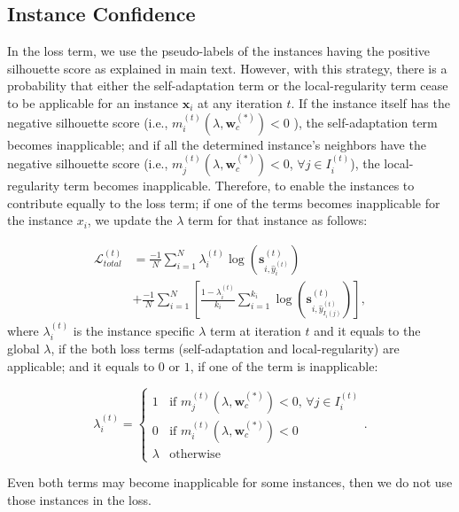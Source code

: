 \documentclass[12pt]{iopart}
\newcommand{\matr}[1]{\mathbf{#1}}
\begin{document}
\subsection{Instance Confidence}
In the loss term, we use the pseudo-labels of the instances having the positive silhouette score as explained in main text. However, with this strategy, there is a probability that either the self-adaptation term or the local-regularity term cease to be applicable for an instance $\matr{x}_i$ at any iteration $t$. If the instance itself has the negative silhouette score (i.e., $m_i^{(t)}(\lambda,\matr{w}_c^{(*)}) < 0$  ), the self-adaptation term becomes inapplicable; and if all the determined instance's neighbors have the negative silhouette score (i.e., $m_j^{(t)}(\lambda,\matr{w}_c^{(*)}) < 0$, $\forall j \in I_i^{(t)}$), the local-regularity term becomes inapplicable. Therefore, to enable the instances to contribute equally to the loss term; if one of the terms becomes inapplicable for the instance $x_i$, we update the $\lambda$ term for that instance as follows:

\begin{equation*}
\begin{split}
    \mathcal{L}^{(t)}_{{total}} &= \frac{-1}{N}\sum_{i=1}^{N}\lambda_i^{(t)}\log(\matr{s}_{i,\hat{y}_i^{(t)}}^{(t)})\\ &+\frac{-1}{N}\sum_{i=1}^{N}[\frac{1-\lambda_i^{(t)}}{k_i}\sum_{i=1}^{k_i} \log(\matr{s}_{i,\hat{y}_{I_i(j)}^{(t)}}^{(t)})],
    \label{eq:positive_loss}
\end{split}
\end{equation*}
where $\lambda_i^{(t)}$ is the instance specific $\lambda$ term at iteration $t$ and it equals to the global $\lambda$, if the both loss terms (self-adaptation and local-regularity) are applicable; and it equals to $0$ or $1$, if one of the term is inapplicable:

\begin{equation*}
  \lambda_i^{(t)} =
    \begin{cases}
      1 & \text{if $m_j^{(t)}(\lambda,\matr{w}_c^{(*)}) < 0$, $\forall j \in I_i^{(t)}$}\\
      0 & \text{if $m_i^{(t)}(\lambda,\matr{w}_c^{(*)}) < 0$}\\
      \lambda & \text{otherwise}
    \end{cases}.      
\end{equation*}

Even both terms may become inapplicable for some instances, then we do not use those instances in the loss.
\end{document}

